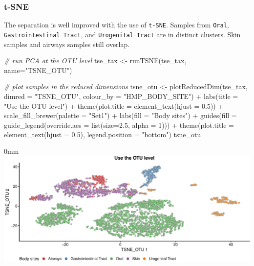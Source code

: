 \documentclass[]{article}
\newcommand{\hlnum}[1]{\textcolor[rgb]{0.816,0.125,0.439}{#1}}%
\newcommand{\hlstr}[1]{\textcolor[rgb]{0.251,0.627,0.251}{#1}}%
\newcommand{\hlcom}[1]{\textcolor[rgb]{0.502,0.502,0.502}{\textit{#1}}}%
\newcommand{\hlopt}[1]{\textcolor[rgb]{0,0,0}{#1}}%
\newcommand{\hlstd}[1]{\textcolor[rgb]{0.251,0.251,0.251}{#1}}%
\newcommand{\hlkwc}[1]{\textcolor[rgb]{0.251,0.251,0.251}{#1}}%
\newcommand{\hlkwd}[1]{\textcolor[rgb]{0.878,0.439,0.125}{#1}}%
\newenvironment{Shaded}{\begin{myshaded}}{\end{myshaded}}
\newcommand{\KeywordTok}[1]{\hlkwd{#1}}
\newcommand{\DataTypeTok}[1]{\hlkwc{#1}}
\newcommand{\DecValTok}[1]{\hlnum{#1}}
\newcommand{\FloatTok}[1]{\hlnum{#1}}
\newcommand{\StringTok}[1]{\hlstr{#1}}
\newcommand{\CommentTok}[1]{\hlcom{#1}}
\newcommand{\OperatorTok}[1]{\hlopt{#1}}
\newcommand{\NormalTok}[1]{\hlstd{#1}}
\begin{document}
\hypertarget{t-sne}{%
\subsubsection{t-SNE}\label{t-sne}}

The separation is well improved with the use of \texttt{t-SNE}. Samples from \texttt{Oral}, \texttt{Gastrointestinal Tract}, and \texttt{Urogenital Tract} are in distinct clusters. Skin samples and airways samples still overlap.

\begin{Shaded}
\begin{Highlighting}[]

\CommentTok{# run PCA at the OTU level}
\NormalTok{tse_tax <-}\StringTok{ }\KeywordTok{runTSNE}\NormalTok{(tse_tax, }\DataTypeTok{name=}\StringTok{"TSNE_OTU"}\NormalTok{)}

\CommentTok{# plot samples in the reduced dimensions}
\NormalTok{tsne_otu <-}\StringTok{ }\KeywordTok{plotReducedDim}\NormalTok{(tse_tax, }\DataTypeTok{dimred =} \StringTok{"TSNE_OTU"}\NormalTok{, }
                           \DataTypeTok{colour_by =} \StringTok{"HMP_BODY_SITE"}\NormalTok{) }\OperatorTok{+}
\StringTok{  }\KeywordTok{labs}\NormalTok{(}\DataTypeTok{title =} \StringTok{"Use the OTU level"}\NormalTok{) }\OperatorTok{+}
\StringTok{  }\KeywordTok{theme}\NormalTok{(}\DataTypeTok{plot.title =} \KeywordTok{element_text}\NormalTok{(}\DataTypeTok{hjust =} \FloatTok{0.5}\NormalTok{)) }\OperatorTok{+}
\StringTok{  }\KeywordTok{scale_fill_brewer}\NormalTok{(}\DataTypeTok{palette =} \StringTok{"Set1"}\NormalTok{) }\OperatorTok{+}
\StringTok{  }\KeywordTok{labs}\NormalTok{(}\DataTypeTok{fill =} \StringTok{"Body sites"}\NormalTok{) }\OperatorTok{+}
\StringTok{  }\KeywordTok{guides}\NormalTok{(}\DataTypeTok{fill =} \KeywordTok{guide_legend}\NormalTok{(}\DataTypeTok{override.aes =} \KeywordTok{list}\NormalTok{(}\DataTypeTok{size=}\FloatTok{2.5}\NormalTok{, }\DataTypeTok{alpha =} \DecValTok{1}\NormalTok{))) }\OperatorTok{+}
\StringTok{  }\KeywordTok{theme}\NormalTok{(}\DataTypeTok{plot.title =} \KeywordTok{element_text}\NormalTok{(}\DataTypeTok{hjust =} \FloatTok{0.5}\NormalTok{),}
        \DataTypeTok{legend.position =} \StringTok{"bottom"}\NormalTok{)}
\NormalTok{tsne_otu}
\end{Highlighting}
\end{Shaded}

\begin{adjustwidth}{\fltoffset}{0mm}
\includegraphics{figure/unnamed-chunk-57-1} \end{adjustwidth}
\end{document}
